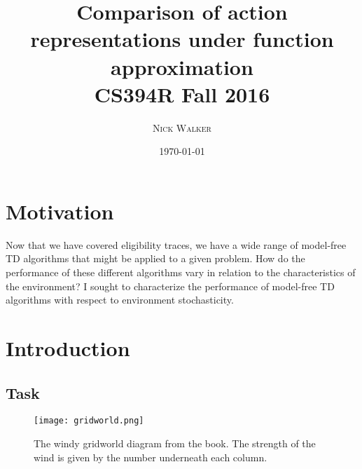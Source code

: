 \documentclass{article}
\title{Comparison of action representations under function approximation \\ \large CS394R Fall 2016} %
\author{\textsc{Nick Walker}} %
\date{\today} %
\begin{document}
	\maketitle %



	\section{Motivation}

	Now that we have covered eligibility traces, we have a wide range of model-free TD algorithms that might be applied to a given problem. How do the performance of these different algorithms vary in relation to the characteristics of the environment? I sought to characterize the performance of model-free TD algorithms with respect to environment stochasticity.




	\section{Introduction}

	\subsection{Task}

			\begin{figure}[h]
				\begin{center}
					\texttt{[image: gridworld.png]}
					\caption{The windy gridworld diagram from the book. The strength of the wind is given by the number underneath each column. }
				\end{center}
			\end{figure}
\end{document}
